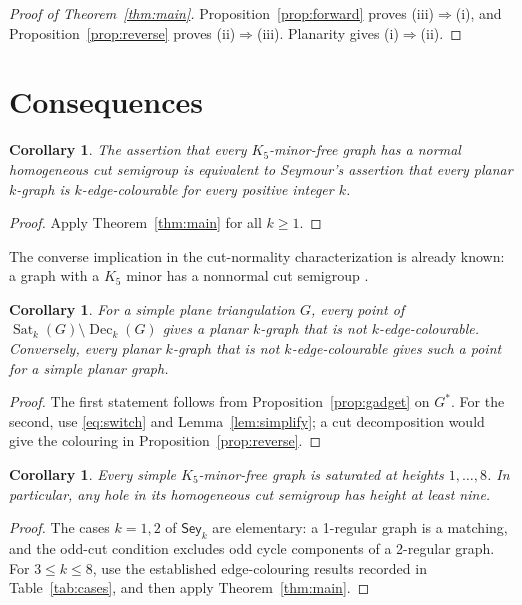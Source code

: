 \documentclass[10pt]{article}
\newtheorem{corollary}[theorem]{Corollary}
\theoremstyle{definition}
\theoremstyle{remark}
\DeclareMathOperator{\Sat}{Sat}
\DeclareMathOperator{\Dec}{Dec}
\begin{document}
\begin{proof}[Proof of Theorem~\ref{thm:main}]
Proposition~\ref{prop:forward} proves (iii)$\Rightarrow$(i), and Proposition~\ref{prop:reverse} proves (ii)$\Rightarrow$(iii).
Planarity gives (i)$\Rightarrow$(ii).
\end{proof}

\section{Consequences}\label{sec:consequences}
\begin{corollary}\label{cor:conjectures}
The assertion that every $K_5$-minor-free graph has a normal homogeneous cut semigroup is equivalent to Seymour's assertion that every planar $k$-graph is $k$-edge-colourable for every positive integer $k$.
\end{corollary}
\begin{proof}
Apply Theorem~\ref{thm:main} for all $k\geq1$.
\end{proof}

The converse implication in the cut-normality characterization is already known: a graph with a $K_5$ minor has a nonnormal cut semigroup \cite[discussion after Conjecture~3.7]{SS}\cite[Section~2]{Ohsugi}.

\begin{corollary}\label{cor:holes}
For a simple plane triangulation $G$, every point of $\Sat_k(G)\setminus\Dec_k(G)$ gives a planar $k$-graph that is not $k$-edge-colourable.
Conversely, every planar $k$-graph that is not $k$-edge-colourable gives such a point for a simple planar graph.
\end{corollary}
\begin{proof}
The first statement follows from Proposition~\ref{prop:gadget} on $G^*$.
For the second, use \eqref{eq:switch} and Lemma~\ref{lem:simplify}; a cut decomposition would give the colouring in Proposition~\ref{prop:reverse}.
\end{proof}

\begin{corollary}\label{cor:eight}
Every simple $K_5$-minor-free graph is saturated at heights $1,\ldots,8$.
In particular, any hole in its homogeneous cut semigroup has height at least nine.
\end{corollary}
\begin{proof}
The cases $k=1,2$ of $\mathsf{Sey}_k$ are elementary: a 1-regular graph is a matching, and the odd-cut condition excludes odd cycle components of a 2-regular graph.
For $3\leq k\leq8$, use the established edge-colouring results recorded in Table~\ref{tab:cases}, and then apply Theorem~\ref{thm:main}.
\end{proof}
\end{document}
